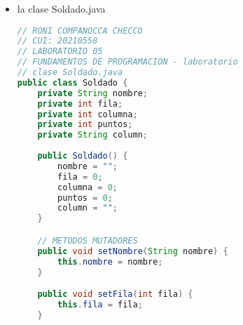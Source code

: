 \documentclass{article}
\begin{document}
\begin{itemize}
\begin{itemize}
\begin{lstlisting}[language=java]
	//METODO PARA IMPRIMIR LOS SOLDADOS DE MAYOR VIDA
	public static void SoldadoConMayorVida (ArrayList<Soldado>soldadito) {
		Soldado mayor = new Soldado();
		mayor.setPuntos(0);
		for(int i=0; i<soldadito.size();i++) {
			if (mayor.getPuntos()<soldadito.get(i).getPuntos()) {
				mayor = soldadito.get(i);
			}
		}
		imprimir(mayor);
	}
	
	// METODO PARA IMPRIMIR EL NOMBRE, LA POSICION Y NIVEL DE VIDA DEL SOLDADO
	public static void imprimir(Soldado soldadito) {
		System.out.println("Nombre: "+soldadito.getNombre()+"\nPosicion: "+soldadito.getColumna()+"X"+soldadito.getFila()+"\tVida: "+soldadito.getPuntos());
	}
	
	// METODO QUE NOS AYUDA A ORDENAR LOS SOLDADOS DE ACUERDO A SU NIVEL DE VIDA, USUANDO UN ALGORITMO DE ORDENAMIENTO DE BURBUJA
	public static void ordenarPorVidaMetodoA(ArrayList<Soldado>soldadito) {
		Soldado aux = new Soldado();
		for(int i=0; i<soldadito.size()-1; i++) {
			for(int j=0; j<soldadito.size()-i-1; j++) {
				if(soldadito.get(j).getPuntos()<soldadito.get(j+1).getPuntos()) {
					aux = soldadito.get(j);
					soldadito.set(j,soldadito.get(j+1));
					soldadito.set(j+1,aux);
				}
			}
		}
	}

    // METODO QUE NOS AYUDA A ORDENAR LOS SOLDADOS DE ACUERDO A SU NIVEL DE VIDA, EN ESTA OCACION DIFERENTE A LA ANTERIOR QUE ERA ALGORITMO DE BURBUJA
    public static void ordenarPorVidaMetodoB(ArrayList<Soldado> soldadito) {
        Collections.sort(soldadito, new Comparator<Soldado>() {
            public int compare(Soldado s1, Soldado s2) {
                // Orden descendente por puntos de vida
                return Integer.compare(s2.getPuntos(), s1.getPuntos());
            }
        });
    }
}
        \end{lstlisting}

        \item la clase Soldado.java
        \begin{lstlisting}[language=java]
// RONI COMPANOCCA CHECCO
// CUI: 20210558
// LABORATORIO 05
// FUNDAMENTOS DE PROGRAMACION - laboratorio
// clase Soldado.java
public class Soldado {
	private String nombre;
	private int fila;
	private int columna;
	private int puntos;
	private String column;
	
	public Soldado() {
		nombre = "";
		fila = 0;
		columna = 0;
		puntos = 0;
		column = "";
	}

	// METODOS MUTADORES
	public void setNombre(String nombre) {
		this.nombre = nombre;
	}

	public void setFila(int fila) {
		this.fila = fila;
	}


\end{lstlisting}
\end{itemize}
\end{itemize}
\end{document}

